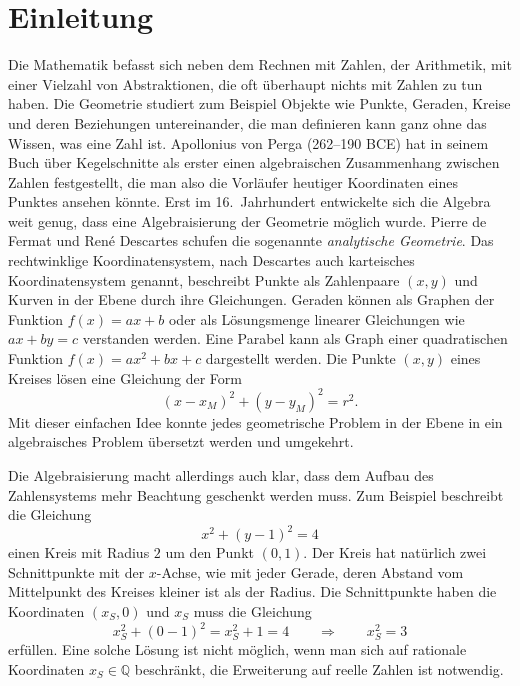 %
%
%
\chapter*{Einleitung\label{chapter:einleitung}}
\rhead{}
Die Mathematik befasst sich neben dem Rechnen mit Zahlen, der Arithmetik,
mit einer Vielzahl von Abstraktionen, die oft überhaupt nichts mit 
Zahlen zu tun haben.
Die Geometrie studiert zum Beispiel Objekte wie Punkte, Geraden, Kreise
und deren Beziehungen untereinander, die man definieren kann ganz ohne
das Wissen, was eine Zahl ist.
Apollonius von Perga (262--190 BCE) hat in seinem Buch über Kegelschnitte
%
%
als erster einen algebraischen Zusammenhang zwischen Zahlen festgestellt,
die man also die Vorläufer heutiger Koordinaten eines Punktes ansehen könnte.
Erst im 16.~Jahrhundert entwickelte sich die Algebra weit genug,
dass eine Algebraisierung der Geometrie möglich wurde.
Pierre de Fermat
%
und René Descartes
%
schufen die sogenannte {\em analytische Geometrie}. 
%
%
Das rechtwinklige Koordinatensystem, nach Descartes auch karteisches
Koordinatensystem genannt, beschreibt Punkte als Zahlenpaare $(x,y)$
%
%
und Kurven in der Ebene durch ihre Gleichungen.
Geraden können als Graphen der Funktion $f(x) = ax+b$ oder als Lösungsmenge
linearer Gleichungen wie $ax+by=c$ verstanden werden.
Eine Parabel kann als Graph einer quadratischen Funktion $f(x)=ax^2+bx+c$
dargestellt werden.
Die Punkte $(x,y)$ eines Kreises lösen eine Gleichung der Form
\[
(x-x_M)^2 + (y-y_M)^2 = r^2.
\]
Mit dieser einfachen Idee konnte jedes geometrische Problem in der Ebene
in ein algebraisches Problem übersetzt werden und umgekehrt.

Die Algebraisierung macht allerdings auch klar, dass dem Aufbau des
Zahlensystems mehr Beachtung geschenkt werden muss.
Zum Beispiel beschreibt die Gleichung
\[
x^2+(y-1)^2=4
\]
einen Kreis mit Radius $2$ um den Punkt $(0,1)$.
Der Kreis hat natürlich zwei Schnittpunkte mit der $x$-Achse, wie mit jeder
Gerade, deren Abstand vom Mittelpunkt des Kreises kleiner ist als der Radius.
Die Schnittpunkte haben die Koordinaten $(x_S,0)$ und $x_S$ muss die
Gleichung
\[
x_S^2 + (0-1)^2 = x_S^2+1=4
\qquad\Rightarrow\qquad
x_S^2=3
\]
erfüllen.
%
Eine solche Lösung ist nicht möglich, wenn man sich auf rationale
Koordinaten $x_S\in\mathbb{Q}$ beschränkt, die Erweiterung auf
reelle Zahlen ist notwendig.
%

